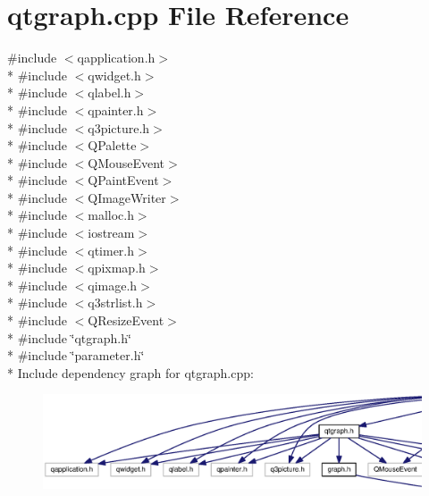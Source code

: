 \section{qtgraph.\-cpp File Reference}
\label{qtgraph_8cpp}
{\ttfamily \#include $<$qapplication.\-h$>$}\\*
{\ttfamily \#include $<$qwidget.\-h$>$}\\*
{\ttfamily \#include $<$qlabel.\-h$>$}\\*
{\ttfamily \#include $<$qpainter.\-h$>$}\\*
{\ttfamily \#include $<$q3picture.\-h$>$}\\*
{\ttfamily \#include $<$Q\-Palette$>$}\\*
{\ttfamily \#include $<$Q\-Mouse\-Event$>$}\\*
{\ttfamily \#include $<$Q\-Paint\-Event$>$}\\*
{\ttfamily \#include $<$Q\-Image\-Writer$>$}\\*
{\ttfamily \#include $<$malloc.\-h$>$}\\*
{\ttfamily \#include $<$iostream$>$}\\*
{\ttfamily \#include $<$qtimer.\-h$>$}\\*
{\ttfamily \#include $<$qpixmap.\-h$>$}\\*
{\ttfamily \#include $<$qimage.\-h$>$}\\*
{\ttfamily \#include $<$q3strlist.\-h$>$}\\*
{\ttfamily \#include $<$Q\-Resize\-Event$>$}\\*
{\ttfamily \#include \char`\"{}qtgraph.\-h\char`\"{}}\\*
{\ttfamily \#include \char`\"{}parameter.\-h\char`\"{}}\\*
Include dependency graph for qtgraph.\-cpp\-:
\nopagebreak
\begin{figure}[H]
\begin{center}
\leavevmode
\includegraphics[width=350pt]{qtgraph_8cpp__incl}
\end{center}
\end{figure}
